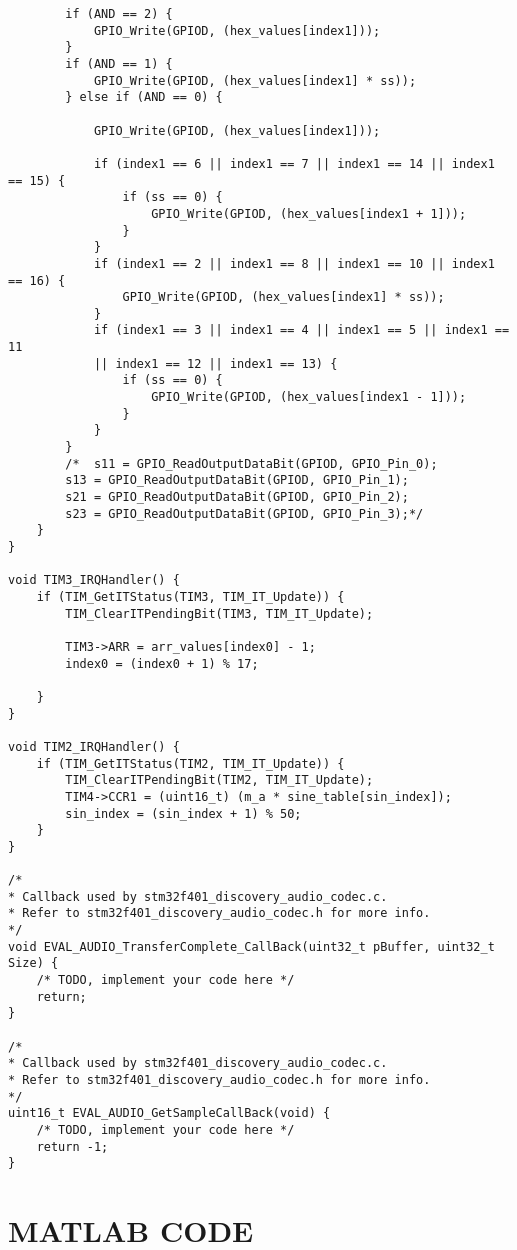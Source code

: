 \begin{lstlisting}
		if (AND == 2) {
			GPIO_Write(GPIOD, (hex_values[index1]));
		}
		if (AND == 1) {
			GPIO_Write(GPIOD, (hex_values[index1] * ss));
		} else if (AND == 0) {
			
			GPIO_Write(GPIOD, (hex_values[index1]));
			
			if (index1 == 6 || index1 == 7 || index1 == 14 || index1 == 15) {
				if (ss == 0) {
					GPIO_Write(GPIOD, (hex_values[index1 + 1]));
				}
			}
			if (index1 == 2 || index1 == 8 || index1 == 10 || index1 == 16) {
				GPIO_Write(GPIOD, (hex_values[index1] * ss));
			}
			if (index1 == 3 || index1 == 4 || index1 == 5 || index1 == 11
			|| index1 == 12 || index1 == 13) {
				if (ss == 0) {
					GPIO_Write(GPIOD, (hex_values[index1 - 1]));
				}
			}
		}
		/*	s11 = GPIO_ReadOutputDataBit(GPIOD, GPIO_Pin_0);
		s13 = GPIO_ReadOutputDataBit(GPIOD, GPIO_Pin_1);
		s21 = GPIO_ReadOutputDataBit(GPIOD, GPIO_Pin_2);
		s23 = GPIO_ReadOutputDataBit(GPIOD, GPIO_Pin_3);*/
	}
}

void TIM3_IRQHandler() {
	if (TIM_GetITStatus(TIM3, TIM_IT_Update)) {
		TIM_ClearITPendingBit(TIM3, TIM_IT_Update);
		
		TIM3->ARR = arr_values[index0] - 1;
		index0 = (index0 + 1) % 17;
		
	}
}

void TIM2_IRQHandler() {
	if (TIM_GetITStatus(TIM2, TIM_IT_Update)) {
		TIM_ClearITPendingBit(TIM2, TIM_IT_Update);
		TIM4->CCR1 = (uint16_t) (m_a * sine_table[sin_index]);
		sin_index = (sin_index + 1) % 50;
	}
}

/*
* Callback used by stm32f401_discovery_audio_codec.c.
* Refer to stm32f401_discovery_audio_codec.h for more info.
*/
void EVAL_AUDIO_TransferComplete_CallBack(uint32_t pBuffer, uint32_t Size) {
	/* TODO, implement your code here */
	return;
}

/*
* Callback used by stm32f401_discovery_audio_codec.c.
* Refer to stm32f401_discovery_audio_codec.h for more info.
*/
uint16_t EVAL_AUDIO_GetSampleCallBack(void) {
	/* TODO, implement your code here */
	return -1;
}
\end{lstlisting}

\section{MATLAB CODE}
